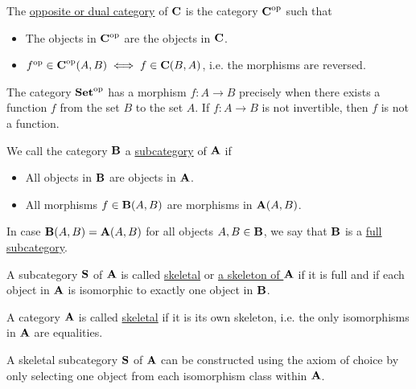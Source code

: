 \begin{definition}\label{def:opposite_category}\cite[construction 1.1.9]{Leinster2014}
  The \ul{opposite or dual category} of $\operatorname{\mathbf{C}}$ is the category $\operatorname{\mathbf{C}}^{\operatorname{op}}$ such that
  \begin{itemize}
    \item The objects in $\operatorname{\mathbf{C}}^{\operatorname{op}}$ are the objects in $\operatorname{\mathbf{C}}$.
    \item $f^{\operatorname{op}} \in \operatorname{\mathbf{C}}^{\operatorname{op}}(A, B) \iff f \in \operatorname{\mathbf{C}}(B, A)$, i.e. the morphisms are reversed.
  \end{itemize}
\end{definition}

\begin{example}
  The category $\operatorname{\mathbf{Set}}^{\operatorname{op}}$ has a morphism $f: A \to B$ precisely when there exists a function $f$ from the set $B$ to the set $A$. If $f: A \to B$ is not invertible, then $f$ is not a function.
\end{example}

\begin{definition}\label{def:subcategory}\cite[definition 1.2.18]{Leinster2014}
  We call the category $\operatorname{\mathbf{B}}$ a \ul{subcategory} of $\operatorname{\mathbf{A}}$ if
  \begin{itemize}
    \item All objects in $\operatorname{\mathbf{B}}$ are objects in $\operatorname{\mathbf{A}}$.
    \item All morphisms $f \in \operatorname{\mathbf{B}}(A, B)$ are morphisms in $\operatorname{\mathbf{A}}(A, B)$.
  \end{itemize}

  In case $\operatorname{\mathbf{B}}(A, B) = \operatorname{\mathbf{A}}(A, B)$ for all objects $A, B \in \operatorname{\mathbf{B}}$, we say that $\operatorname{\mathbf{B}}$ is a \ul{full subcategory}.
\end{definition}

\begin{definition}\label{def:skeletal_category}\cite[91]{MacLane1994}
  A subcategory $\operatorname{\mathbf{S}}$ of $\operatorname{\mathbf{A}}$ is called \ul{skeletal} or \ul{a skeleton of $\operatorname{\mathbf{A}}$} if it is full and if each object in $\operatorname{\mathbf{A}}$ is isomorphic to exactly one object in $\operatorname{\mathbf{B}}$.

  A category $\operatorname{\mathbf{A}}$ is called \ul{skeletal} if it is its own skeleton, i.e. the only isomorphisms in $\operatorname{\mathbf{A}}$ are equalities.
\end{definition}

\begin{note}\label{note:skeletal_subcategory_exists}
   A skeletal subcategory $\operatorname{\mathbf{S}}$ of $\operatorname{\mathbf{A}}$ can be constructed using the axiom of choice by only selecting one object from each isomorphism class within $\operatorname{\mathbf{A}}$.
\end{note}

